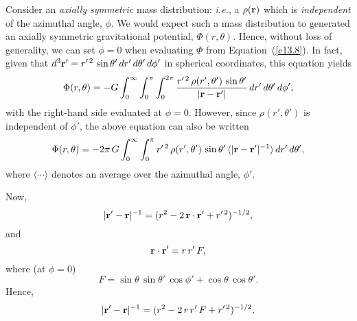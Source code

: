 Consider an {\em axially symmetric}\/ mass distribution: {\em i.e.}, a $\rho({\bf r})$
which is {\em independent}\/ of the azimuthal angle, $\phi$. We would expect
such a mass distribution to generated an axially symmetric gravitational
potential, $\Phi(r,\theta)$. Hence, without loss of generality, we can
set $\phi=0$ when evaluating $\Phi$ from Equation~(\ref{e13.8}). In fact,
given that $d^3{\bf r}' = r'^{\,2}\,\sin\theta'\,dr'\,d\theta'\,d\phi'$
in spherical  coordinates, this equation yields
\begin{equation}
\Phi(r,\theta) = - G\int_0^\infty\int_0^\pi\int_0^{2\pi}
\frac{r'^{\,2}\,\rho(r',\theta')\,\sin\theta'}{|{\bf r}-{\bf r}'|}\,dr'\,d\theta'\,d\phi',
\end{equation}
with the right-hand side evaluated at $\phi=0$. However, since
$\rho(r',\theta')$ is independent of $\phi'$, the above equation
can also be written
\begin{equation}\label{e13.13}
\Phi(r,\theta) = - 2\pi\,G\int_0^\infty\int_0^\pi
r'^{\,2}\,\rho(r',\theta')\,\sin\theta'\,\langle|{\bf r}-{\bf r}'|^{-1}\rangle\,dr'\,d\theta',
\end{equation}
where $\langle\cdots\rangle$ denotes an average over the azimuthal angle,
$\phi'$. 

Now, 
\begin{equation}
|{\bf r}'-{\bf r}|^{-1} = (r^{2}-2\,{\bf r}\cdot{\bf r}' + r'^{\,2})^{-1/2},
\end{equation}
and 
\begin{equation}
{\bf r}\cdot{\bf r}' = r\,r'\,F,
\end{equation}
where (at $\phi=0$)
\begin{equation}
F = \sin\theta\,\sin\theta'\,\cos\phi' + \cos\theta\,\cos\theta'.
\end{equation}
Hence,
\begin{equation}
|{\bf r}'-{\bf r}|^{-1} = (r^{2}-2\,r\,r'\,F + r'^{\,2})^{-1/2}.
\end{equation}

